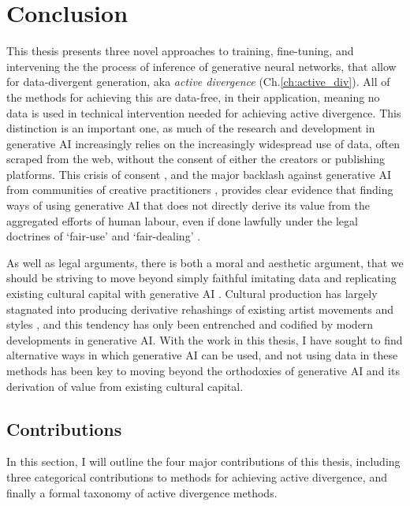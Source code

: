 \chapter{Conclusion}
\label{ch:conclusion}

This thesis presents three novel approaches to training, fine-tuning, and intervening the the process of inference of generative neural networks, that allow for data-divergent generation, aka \textit{active divergence} (Ch.\ref{ch:active_div}).
All of the methods for achieving this are data-free, in their application, meaning no data is used in technical intervention needed for achieving active divergence.
This distinction is an important one, as much of the research and development in generative AI increasingly relies on the increasingly widespread use of data, often scraped from the web, without the consent of either the creators or publishing platforms.
This crisis of consent \citep{longpre2024consent}, and the major backlash against generative AI from communities of creative practitioners \citep{whiddington2022backlash}, provides clear evidence that finding ways of using generative AI that does not directly derive its value from the aggregated efforts of human labour, even if done lawfully under the legal doctrines of `fair-use' \citep{sobel2017artificial,alhadeff2024limits} and `fair-dealing' \citep{guadamuz2023scanner}.

As well as legal arguments, there is both a moral and aesthetic argument, that we should be striving to move beyond simply faithful imitating data and replicating existing cultural capital with generative AI \citep{rafferty2016future}. 
Cultural production has largely stagnated into producing derivative rehashings of existing artist movements and styles \citep{fisher2009capitalist}, and this tendency has only been entrenched and codified by modern developments in generative AI.
With the work in this thesis, I have sought to find alternative ways in which generative AI can be used, and not using data in these methods has been key to moving beyond the orthodoxies of generative AI and its derivation of value from existing cultural capital.

\section{Contributions}

In this section, I will outline the four major contributions of this thesis, including three categorical contributions to methods for achieving active divergence, and finally a formal taxonomy of active divergence methods.

